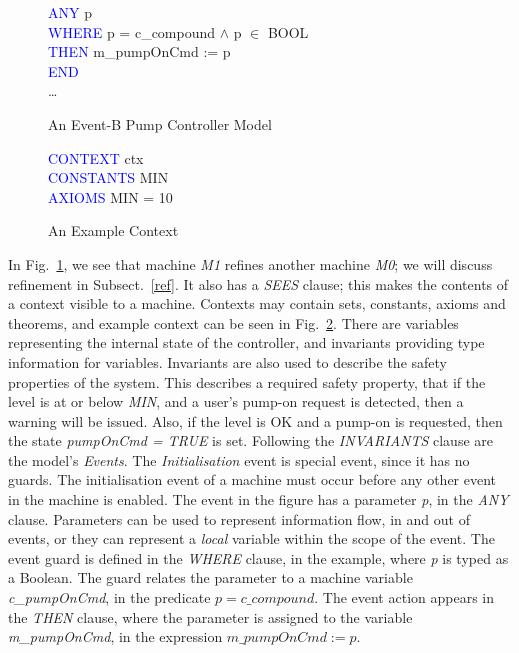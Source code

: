 \begin{figure}[h]
\begin{minipage}{0.8\textwidth}
\hspace*{0.2cm}\textcolor{blue}{ANY} p\\
\hspace*{0.2cm}\textcolor{blue}{WHERE} p = c\_compound $\land$ p $\in$ BOOL  \\
\hspace*{0.2cm}\textcolor{blue}{THEN} m\_pumpOnCmd :=  p\\
\hspace*{0.2cm}\textcolor{blue}{END}\\
\ldots
\end{minipage}
\caption{An Event-B  Pump Controller Model}
\label{fig:controllerSpec2}
\end{figure}
%
%
%
\begin{figure}[b]
\centering
\begin{minipage}{0.3\textwidth}
\textcolor{blue}{CONTEXT} ctx  \\
\textcolor{blue}{CONSTANTS} MIN\\
\textcolor{blue}{AXIOMS} MIN = 10
\end{minipage}
\caption{An Example Context}
\label{fig:context}
\end{figure}
%
%
 In Fig.~\ref{fig:controllerSpec2}, we see that machine \emph{M1} refines another machine \emph{M0}; we will discuss refinement in Subsect.~\ref{ref}. It also has a \emph{SEES} clause; this makes the contents of a context visible to a machine. Contexts may contain sets, constants, axioms and theorems, and example context can be seen in Fig.~\ref{fig:context}. There are variables representing the internal state of the controller, and invariants providing type information for variables. Invariants are also used to describe the safety properties of the system. This describes a required safety property, that if the level is at or below \emph{MIN}, and a user's pump-on request is detected, then a warning will be issued. Also, if the level is OK and a pump-on is requested, then the state \emph{pumpOnCmd = TRUE} is  set.  Following the \emph{INVARIANTS} clause are the model's \emph{Events}. The \emph{Initialisation} event is special event, since it has no guards. The initialisation event of a machine must occur before any other event in the machine is enabled. The event in the figure has a parameter \emph{p}, in the \emph{ANY} clause. Parameters can be used to represent information flow, in and out of events, or they can represent a \emph{local} variable within the scope of the event. The event guard is defined in the \emph{WHERE} clause, in the example, where \emph{p} is typed as a Boolean. The guard relates the parameter to a machine variable \emph{c\_pumpOnCmd}, in the predicate $ p = c\_compound$. The event action appears in the \emph{THEN} clause, where the parameter is assigned to the variable \emph{m\_pumpOnCmd}, in the expression $m\_pumpOnCmd := p$.


